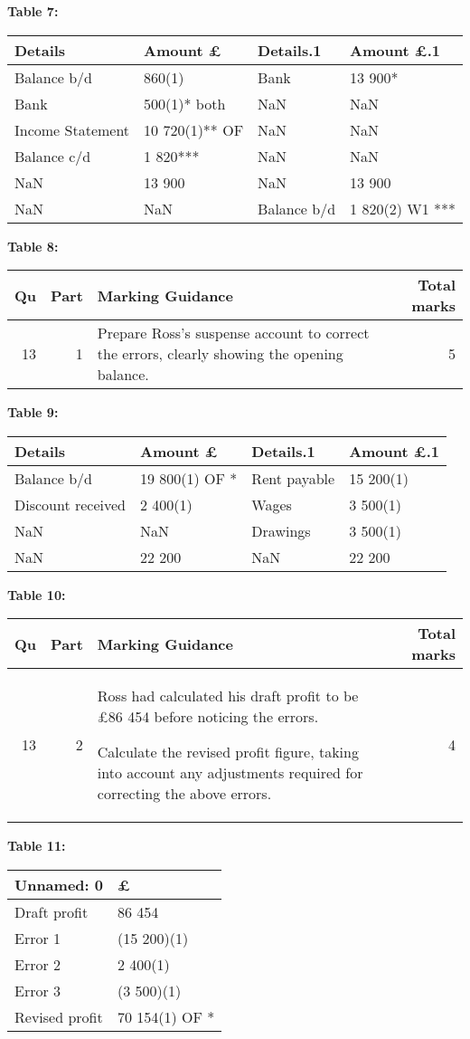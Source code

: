 \documentclass{article}
\begin{document}
\textbf{Table 7:}
\begin{tabular}{llll}
\toprule
Details & Amount
£ & Details.1 & Amount
£.1 \\
\midrule
Balance b/d & 860(1) & Bank & 13 900* \\
Bank & 500(1)* both & NaN & NaN \\
Income Statement & 10 720(1)** OF & NaN & NaN \\
Balance c/d & 1 820*** & NaN & NaN \\
NaN & 13 900 & NaN & 13 900 \\
NaN & NaN & Balance b/d & 1 820(2) W1 *** \\
\bottomrule
\end{tabular}

\textbf{Table 8:}
\begin{tabular}{rrlr}
\toprule
Qu & Part & Marking Guidance & Total
marks \\
\midrule
13 & 1 & Prepare Ross’s suspense account to correct the errors, clearly showing the
opening balance. & 5 \\
\bottomrule
\end{tabular}

\textbf{Table 9:}
\begin{tabular}{llll}
\toprule
Details & Amount
£ & Details.1 & Amount
£.1 \\
\midrule
Balance b/d & 19 800(1) OF * & Rent payable & 15 200(1) \\
Discount received & 2 400(1) & Wages & 3 500(1) \\
NaN & NaN & Drawings & 3 500(1) \\
NaN & 22 200 & NaN & 22 200 \\
\bottomrule
\end{tabular}

\textbf{Table 10:}
\begin{tabular}{rrlr}
\toprule
Qu & Part & Marking Guidance & Total
marks \\
\midrule
13 & 2 & Ross had calculated his draft profit to be £86 454 before noticing the errors.

Calculate the revised profit figure, taking into account any adjustments required
for correcting the above errors. & 4 \\
\bottomrule
\end{tabular}

\textbf{Table 11:}
\begin{tabular}{ll}
\toprule
Unnamed: 0 & £ \\
\midrule
Draft profit & 86 454 \\
Error 1 & (15 200)(1) \\
Error 2 & 2 400(1) \\
Error 3 & (3 500)(1) \\
Revised profit & 70 154(1) OF * \\
\bottomrule
\end{tabular}
\end{document}
